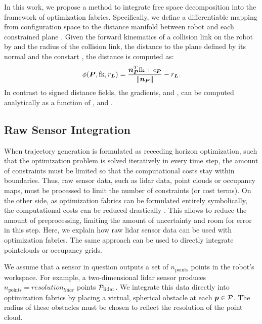 In this work, we propose a method to integrate free space
decomposition into the framework of optimization \ac{fabrics}. Specifically, we
define a differentiable mapping from configuration space \Q{} to the distance
manifold between robot and each constrained plane \plane{}. Given the forward
kinematics of a collision link on the robot by \fk{} and the radius of the
collision link, the distance to the plane \plane{} defined by its normal
\np{} and the constart \cp{}, the distance is computed as:
\begin{equation}
  \phi({\bm{P},\textrm{fk},r_{\bm{L}}}) = \frac{\bm{n}_{\bm{P}}^T\textrm{fk} + c_{\bm{P}}}{\left\lVert\bm{n}_{\bm{P}}\right\rVert} - r_{\bm{L}}
  \label{eq:point_plane_distance}.
\end{equation}
In contrast to signed distance fields, the gradients, \J{} and \Jdot{}, can be
computed analytically as a function of \q{}, \np{} and \cp{}.



\subsection{Raw Sensor Integration}
\label{sub:raw_sensor_integration}


When trajectory generation is formulated as receeding horizon optimization, such
that the optimization problem is solved iteratively in every time step, the
amount of constraints must be limited so that the computational costs stay
within boundaries. Thus, raw sensor data, such as lidar data, point clouds or 
occupancy maps, must be processed to limit the number of constraints (or cost
terms). On the other side, as optimization \ac{fabrics} can be formulated entirely
symbolically, the computational costs can be reduced drastically
\cite{Spahn2022}. This allows to reduce the amount of preprocessing,
limiting the amount of uncertainty and room for error in this step. Here, we
explain how raw lidar sensor data can be used with optimization \ac{fabrics}.
The same approach can be used to directly integrate pointclouds or occupancy
grids.

We assume that a sensor in question outputs a set of $n_{\textrm{points}}$
points \pointcloud{} in the robot's workspace. For example, a two-dimensional
lidar sensor produces $n_{\textrm{points}}=resolution_{lidar}$ points
$\mathcal{P}_{\textrm{lidar}}$. We integrate this data directly into
optimization \ac{fabrics} by placing a virtual, spherical obstacle at each $\bm{p}
\in \mathcal{P}$. The radius of these obstacles must be chosen to reflect the
resolution of the point cloud.




